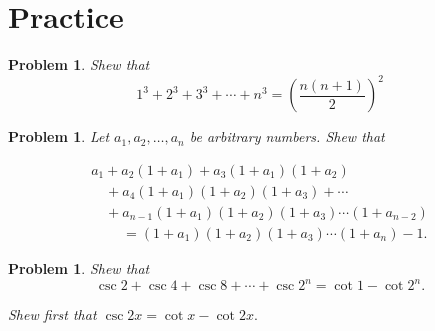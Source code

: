 \documentclass[11pt, openany]{book}
\theoremstyle{change} \theoremheaderfont{\blue\sffamily\bfseries}
\newtheorem{pro}[thm]{Problem}
\theoremstyle{nonumberplain} \theoremheaderfont{\sffamily\bfseries}
\newcommand{\í}{\'{\i}}
\begin{document}
\section*{Practice}\begin{multicols}{2}\columnseprule 1pt \columnsep 25pt

\begin{pro} Shew that
\begin{equation}
1^3 + 2^3 + 3^3 + \cdots + n^3 = \left(\frac{n(n + 1)}{2}\right)
^2
\end{equation}
\end{pro}
\begin{pro}Let $a_1, a_2, \ldots , a_n$ be arbitrary numbers. Shew that

$$
\begin{array}{l}
a_1 + a_2(1 + a_1) + a_3(1 + a_1)(1 + a_2) \\ \quad + a_4(1 + a_1)(1 + a_2)(1 + a_3)  + \cdots \\
\quad + a_{n - 1}(1 + a_1)(1 + a_2)(1 + a_3)\cdots (1 + a_{n - 2})  \\
\qquad\ = (1 + a_1)(1 + a_2)(1 + a_3)\cdots (1 + a_n) - 1.
\end{array}$$
\end{pro}
\begin{pro} Shew that
$$\csc 2 + \csc 4 + \csc 8 + \cdots + \csc 2^n = \cot 1 - \cot 2^n.$$
\begin{answer}
Shew first that $\csc 2x = \cot x - \cot 2x.$


\end{answer}
\end{pro}
\end{multicols}
\end{document}

